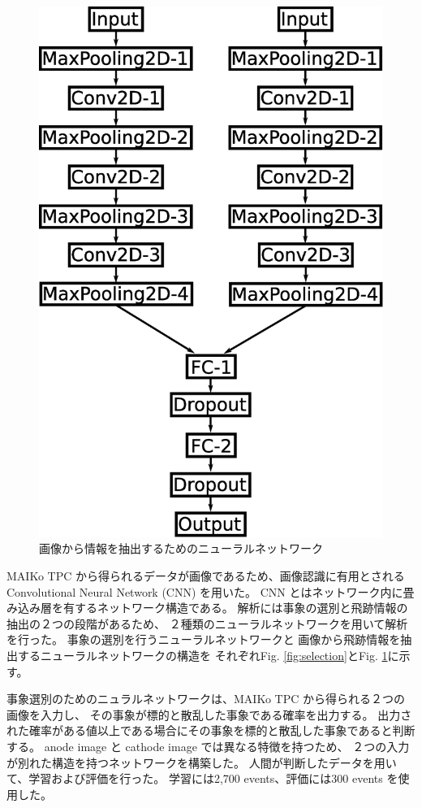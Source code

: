 \documentclass{jps-cp}
\begin{document}
\begin{figure}
\begin{minipage}{0.4\columnwidth}
    \includegraphics[clip, width=0.9\columnwidth]{eps/point_detection.eps}
    \caption{画像から情報を抽出するためのニューラルネットワーク}
    \label{fig:extraction}
  \end{minipage}
\end{figure}

MAIKo TPC から得られるデータが画像であるため、画像認識に有用とされるConvolutional Neural Network (CNN) を用いた。
CNN とはネットワーク内に畳み込み層を有するネットワーク構造である。
解析には事象の選別と飛跡情報の抽出の２つの段階があるため、
２種類のニューラルネットワークを用いて解析を行った。
事象の選別を行うニューラルネットワークと
画像から飛跡情報を抽出するニューラルネットワークの構造を
それぞれFig. \ref{fig:selection}とFig. \ref{fig:extraction}に示す。

事象選別のためのニュラルネットワークは、MAIKo TPC から得られる２つの画像を入力し、
その事象が標的と散乱した事象である確率を出力する。
出力された確率がある値以上である場合にその事象を標的と散乱した事象であると判断する。
anode image と cathode image では異なる特徴を持つため、
２つの入力が別れた構造を持つネットワークを構築した。
人間が判断したデータを用いて、学習および評価を行った。
学習には2,700 events、評価には300 events を使用した。
\end{document}
